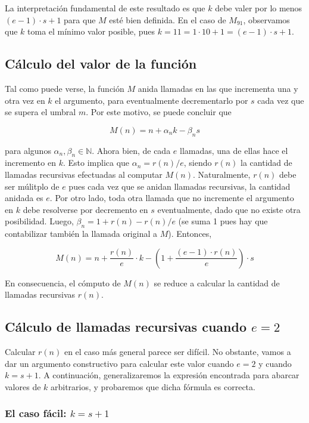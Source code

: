\documentclass[a4paper,10pt]{article}
\newcommand{\Nat}{\ensuremath{\mathbb{N}}}
\begin{document}
La interpretaci\'on fundamental de este resultado es que $k$ debe valer por lo menos $(e-1)\cdot s + 1$ para que
$M$ est\'e bien definida. En el caso de $M_{91}$, observamos que $k$ toma el m\'inimo valor posible, pues
$k = 11 = 1 \cdot 10 + 1 = (e - 1) \cdot s + 1$.

\subsection{C\'alculo del valor de la funci\'on}

Tal como puede verse, la funci\'on $M$ anida llamadas en las que incrementa una y otra vez en $k$ el argumento, para
eventualmente decrementarlo por $s$ cada vez que se supera el umbral $m$. Por este motivo, se puede concluir que

$$M(n) = n + \alpha_n k - \beta_n s$$

para algunos $\alpha_n, \beta_n \in \Nat$. Ahora bien, de cada $e$ llamadas, una de ellas hace el incremento en $k$. Esto
implica que $\alpha_n = r(n) / e$, siendo $r(n)$ la cantidad de llamadas recursivas efectuadas al computar
$M(n)$. Naturalmente, $r(n)$ debe ser m\'ulitplo de $e$ pues cada vez que se anidan llamadas recursivas, la cantidad
anidada es $e$. Por otro lado, toda otra llamada que no incremente el argumento en $k$ debe resolverse
por decremento en $s$ eventualmente, dado que no existe otra posibilidad. Luego, $\beta_n = 1 + r(n) - r(n)/e$ (se
suma 1 pues hay que contabilizar tambi\'en la llamada original a $M$). Entonces,

$$M(n) = n + \frac{r(n)}{e} \cdot k - \left(1 + \frac{(e-1) \cdot r(n)}{e}\right) \cdot s$$

En consecuencia, el c\'omputo de $M(n)$ se reduce a calcular la cantidad de llamadas recursivas $r(n)$. 

\subsection{C\'alculo de llamadas recursivas cuando $e = 2$}

Calcular $r(n)$ en el caso m\'as general parece ser dif\'icil. No obstante, vamos a dar un argumento constructivo
para calcular este valor cuando $e = 2$ y cuando $k = s + 1$. A continuaci\'on, generalizaremos la expresi\'on
encontrada para abarcar valores de $k$ arbitrarios, y probaremos que dicha f\'ormula es correcta.

\subsubsection{El caso f\'acil: $k = s + 1$}
\end{document}
